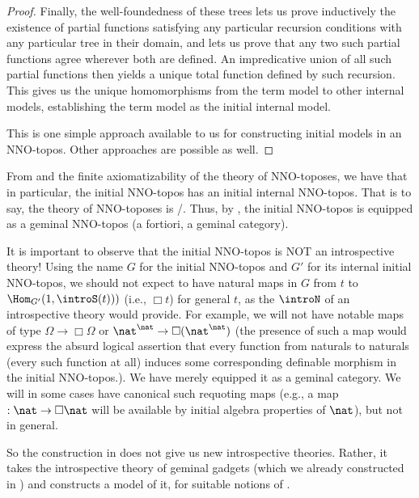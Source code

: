 \begin{proof}
Finally, the well-foundedness of these trees lets us prove inductively the existence of partial functions satisfying any particular recursion conditions with any particular tree in their domain, and lets us prove that any two such partial functions agree wherever both are defined. An impredicative union of all such partial functions then yields a unique total function defined by such recursion. This gives us the unique homomorphisms from the term model to other internal models, establishing the term model as the initial internal model.

This is one simple approach available to us for constructing initial models in an NNO-topos. Other approaches are possible as well. 

\end{proof}

From  and the finite axiomatizability of the theory of NNO-toposes, we have that in particular, the initial NNO-topos has an initial internal NNO-topos. That is to say, the theory of NNO-toposes is \initogeminal/. Thus, by , the initial NNO-topos is equipped as a geminal NNO-topos (a fortiori, a geminal category).

\begin{warningenv}\label{InitoGeminalWarning}
It is important to observe that the initial NNO-topos is NOT an introspective theory! Using the name $G$ for the initial NNO-topos and $G'$ for its internal initial NNO-topos, we should not expect to have natural maps in $G$ from $t$ to $\Hom_{G'}(1, \introS(t)))$ (i.e., $\Box t$) for general $t$, as the $\introN$ of an introspective theory would provide. For example, we will not have notable maps of type $\Omega \to \Box \Omega$ or $\nat^{\nat} \to \Box(\nat^{\nat})$ (the presence of such a map would express the absurd logical assertion that every function from naturals to naturals (every such function at all) induces some corresponding definable morphism in the initial NNO-topos.). We have merely equipped it as a geminal category. We will in some cases have canonical such requoting maps (e.g., a map $: \nat \to \Box \nat$ will be available by initial algebra properties of $\nat$), but not in general.

So the construction in  does not give us new introspective theories. Rather, it takes the introspective theory of geminal gadgets (which we already constructed in \TODO) and constructs a model of it, for suitable notions of .
\end{warningenv}

